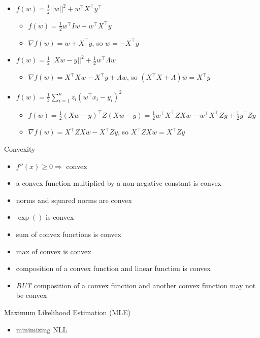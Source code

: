 \documentclass[10pt,landscape,a4paper]{article}
\begin{document}
\begin{multicols*}{5}
\begin{itemize}
    \item \(f(w) = \frac{1}{2} ||w||^2 + w^\intercal X^\intercal y^\intercal\)
    \begin{itemize}
        \item \(f(w) = \frac{1}{2} w^\intercal I w + w^\intercal X^\intercal y\)
        \item \(\nabla f(w) = w + X^\intercal y\), so \(w=-X^\intercal y\)
    \end{itemize}
    \item \(f(w) = \frac{1}{2} ||Xw-y||^2 + \frac{1}{2} w^\intercal \Lambda w\)
    \begin{itemize}
        \item \(\nabla f(w) = X^\intercal X w - X^\intercal y + \Lambda w\), so \((X^\intercal X + \Lambda)w = X^\intercal y\)
    \end{itemize}
    \item \(f(w) = \frac{1}{2} \sum\limits_{i=1}^{n} z_i (w^\intercal  x_i - y_i)^2\)
    \begin{itemize}
        \item \(f(w) = \frac{1}{2} (Xw-y)^\intercal Z (Xw-y)  = \frac{1}{2} w^\intercal X^\intercal Z X w - w^\intercal X^\intercal Z y + \frac{1}{2} y^\intercal Z y\)
        \item \(\nabla f(w) = X^\intercal Z X w - X^\intercal Z y\), so \(X^\intercal Z X w = X^\intercal Z y\)
    \end{itemize}
\end{itemize}
Convexity
\begin{itemize}
    \item \(f''(x) \geq 0 \Rightarrow \) convex
    \item a convex function multiplied by a non-negative constant is convex
    \item norms and squared norms are convex
    \item \(\exp()\) is convex
    \item sum of convex functions is convex
    \item max of convex is convex
    \item composition of a convex function and linear function is convex
    \item \emph{BUT} composition of a convex function and another convex function may not be convex
\end{itemize}
Maximum Likelihood Estimation (MLE) \\
\begin{itemize}
    \item minimizing NLL

\end{itemize}
\end{multicols*}
\end{document}
